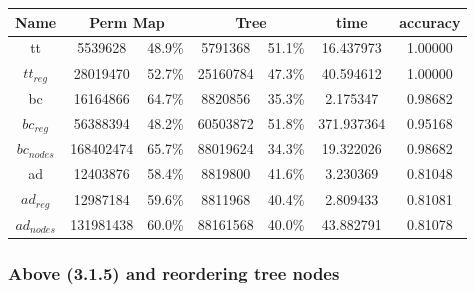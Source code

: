 \documentclass[]{article}
\theoremstyle{definition}
\begin{document}
\begin{center}
\begin{tabular} { |c|c|c|c|c|c|c| }
\hline
Name & \multicolumn{2}{c|}{Perm Map} & \multicolumn{2}{c|}{Tree} & time & accuracy \\
\hline

tt & 5539628 & 48.9\%  & 5791368 & 51.1\% & 16.437973 & 1.00000 \\

$tt_{reg}$ & 28019470 & 52.7\% & 25160784 & 47.3\% & 40.594612 & 1.00000 \\

bc & 16164866 & 64.7\% & 8820856 & 35.3\% & 2.175347 & 0.98682 \\

$bc_{reg}$ & 56388394 & 48.2\% & 60503872 & 51.8\% & 371.937364 & 0.95168 \\

$bc_{nodes}$ & 168402474 & 65.7\% & 88019624 & 34.3\% & 19.322026 & 0.98682 \\

ad & 12403876 & 58.4\% & 8819800 & 41.6\% & 3.230369 & 0.81048 \\

$ad_{reg}$ &12987184 & 59.6\% & 8811968 & 40.4\% & 2.809433 & 0.81081 \\

$ad_{nodes}$ & 131981438 & 60.0\% & 88161568 & 40.0\% & 43.882791 & 0.81078 \\
\hline
\end{tabular}
\end{center}

\subsubsection{Above (3.1.5) and reordering tree nodes}
\end{document}
